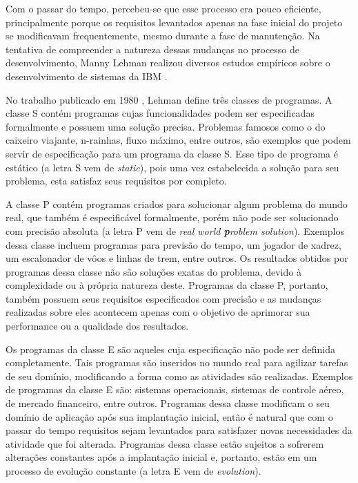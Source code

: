 \documentclass[a4paper, 12pt, twoside]{book}
\begin{document}
        Com o passar do tempo, percebeu-se que esse processo era pouco eficiente, 
        principalmente porque os requisitos levantados apenas na fase inicial do projeto se 
        modificavam frequentemente, mesmo durante a fase de manutenção. Na tentativa de compreender
        a natureza dessas mudanças no processo de desenvolvimento, Manny Lehman realizou diversos 
        estudos empíricos sobre o desenvolvimento de sistemas da IBM \cite{Lehman2,Lehman1980b,Lehman1985}.
        
        No trabalho publicado em 1980 \cite{Lehman1980b}, Lehman define três classes de programas.
        A classe S contém programas cujas funcionalidades podem ser especificadas formalmente e possuem uma 
        solução precisa. Problemas famosos como o do caixeiro viajante, n-rainhas, fluxo máximo, entre outros,
        são exemplos que podem servir de especificação para um programa da classe S. Esse 
        tipo de programa é estático (a letra S vem de \textit{static}), pois uma vez estabelecida a 
        solução para seu problema, esta satisfaz seus requisitos por completo.
        
        A classe P contém programas criados para solucionar algum problema do mundo real, que também   
        é especificável formalmente, porém não pode ser solucionado com precisão absoluta (a letra P 
        vem de \textit{real world \textbf{p}roblem solution}). Exemplos
        dessa classe incluem programas para previsão do tempo, um jogador de xadrez, um 
        escalonador de vôos e linhas de trem, entre outros. Os resultados obtidos por programas dessa
        classe não são soluções exatas do problema, devido à complexidade ou à própria natureza deste.
        Programas da classe P, portanto, também possuem seus requisitos especificados com precisão e 
        as mudanças realizadas sobre eles acontecem apenas com o objetivo de aprimorar sua performance ou a qualidade dos resultados.
        
        Os programas da classe E são aqueles cuja especificação não pode ser definida completamente.
        Tais programas são inseridos no mundo real para agilizar tarefas de seu domínio, modificando 
        a forma como as atividades são realizadas. Exemplos de programas da classe E são: sistemas 
        operacionais, sistemas de controle aéreo, de mercado financeiro, entre outros. Programas 
        dessa classe modificam o seu domínio de aplicação após sua implantação inicial, então é 
        natural que com o passar do tempo requisitos sejam levantados para satisfazer 
        novas necessidades da atividade que foi alterada. Programas dessa classe estão
        sujeitos a sofrerem alterações constantes após a implantação inicial e, portanto, estão
        em um processo de evolução constante (a letra E vem de \textit{evolution}).
        
\end{document}
